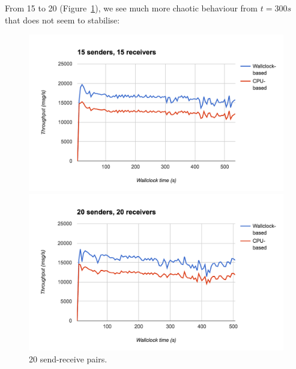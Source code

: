 From 15 to 20 (Figure~\ref{fig:15n20}), we see much more chaotic behaviour from $t=300s$ that does not seem to stabilise:
\begin{figure}
  \centering\includegraphics[width=\textwidth]{../transcripts/lipsum/15n15/graph.png}

  \centering\includegraphics[width=\textwidth]{../transcripts/lipsum/20n20/graph.png}
  \caption{20 send-receive pairs.}
  \label{fig:15n20}
\end{figure}

